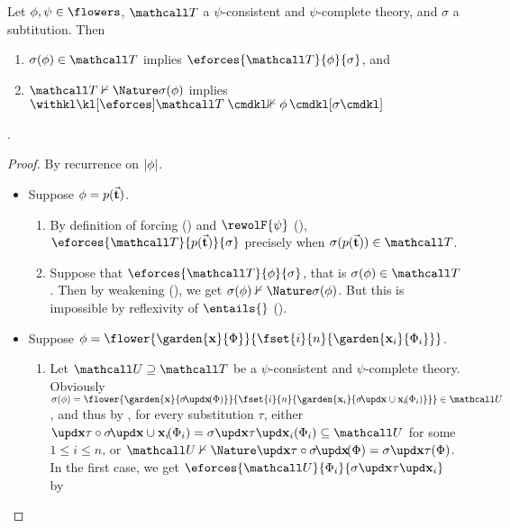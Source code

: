 \begin{lemma}[Adequacy]

  Let $\phi, \psi \in \flowers$, $\tT$ a $\psi$-consistent and $\psi$-complete
  theory, and $\sigma$ a subtitution.
  Then
  \begin{enumerate}
    \item $\sigma(\phi) \in \tT$ implies $\eforces{\tT}{\phi}{\sigma}$, and
    \item $\tT \nvdash{\Nature} \sigma(\phi)$ implies $\neforces{\tT}{\phi}{\sigma}$
  \end{enumerate}.
\end{lemma}
\begin{proof}
  By recurrence on $\left|\phi\right|$.
  \begin{itemize}
    \item Suppose $\phi = p(\vec{\mathbf{t}})$.
    \begin{enumerate}
      \item By definition of forcing () and $\rewolF{\psi}$
      (), $\eforces{\tT}{p(\tvec{t})}{\sigma}$ precisely when
      $\sigma(p(\tvec{t})) \in \tT$.
      \item Suppose that $\eforces{\tT}{\phi}{\sigma}$, that is $\sigma(\phi)
      \in \tT$. Then by weakening (), we get $\sigma(\phi)
      \nvdash{\Nature} \sigma(\phi)$. But this is impossible by reflexivity of
      $\entails{}$ ().
    \end{enumerate}
    \item Suppose $\phi =
    \flower{\garden{\bx}{\Phi}}{\fset{i}{n}{\garden{\bx_i}{\Phi_i}}}$.
    \begin{enumerate}
      \item Let $\tU \supseteq \tT$ be a $\psi$-consistent and $\psi$-complete
      theory. Obviously $\sigma(\phi) =
      \flower{\garden{\bx}{\restr{\sigma}{\bx}(\Phi)}}{\fset{i}{n}{\garden{\bx_i}{\restr{\sigma}{\bx
      \cup \bx_i}(\Phi_i)}}} \in \tU$, and thus by ,
      for every substitution $\tau$, either $ \update{}{\bx}{\tau} \circ
      \restr{\sigma}{\bx \cup \bx_i}(\Phi_i) =
      \update{\update{\sigma}{\bx}{\tau}}{\bx_i}{}(\Phi_i) \subseteq \tU$ for
      some $1 \leq i \leq n$, or $\tU \nvdash{\Nature} \update{}{\bx}{\tau} \circ
      \restr{\sigma}{\bx}(\Phi) = \update{\sigma}{\bx}{\tau}(\Phi)$. In the
      first case, we get
      $\eforces{\tU}{\Phi_i}{\update{\update{\sigma}{\bx}{\tau}}{\bx_i}{}}$ by

\end{enumerate}
\end{itemize}
\end{proof}
